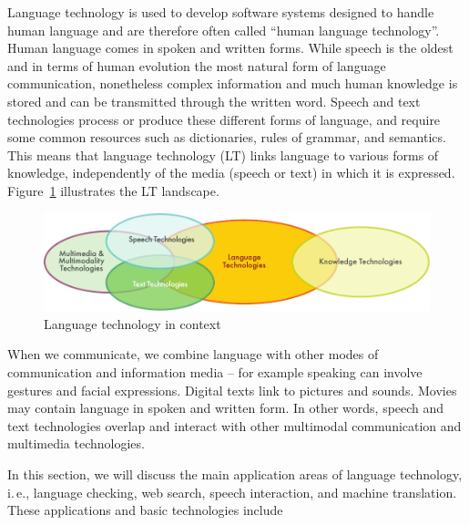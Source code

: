 \clearpage

\label{LTforIrish_en}

\begin{multicols}{2}

Language technology is used to develop software systems designed to handle human language and are therefore often called ``human language technology''. Human language comes in spoken and written forms. While speech is the oldest and in terms of human evolution the most natural form of language communication, nonetheless complex information and much human knowledge is stored and can be transmitted through the written word. Speech and text technologies process or produce these different forms of language, and require some common resources such as dictionaries, rules of grammar, and semantics. This means that language technology (LT) links language to various forms of knowledge, independently of the media (speech or text) in which it is expressed. Figure~\ref{fig:ltincontext_en} illustrates the LT landscape.

\begin{figure}[htb]
  \center
  \includegraphics[width=\textwidth]{../_media/english/language_technologies}
  \caption{Language technology in context}
  \label{fig:ltincontext_en}
\end{figure}

When we communicate, we combine language with other modes of communication and information media -- for example speaking can involve gestures and facial expressions. Digital texts link to pictures and sounds. Movies may contain language in spoken and written form. In other words, speech and text technologies overlap and interact with other multimodal communication and multimedia technologies.

In this section, we will discuss the main application areas of language technology, i.\,e., language checking, web search, speech interaction, and machine translation. These applications and basic technologies include 


\end{multicols}

